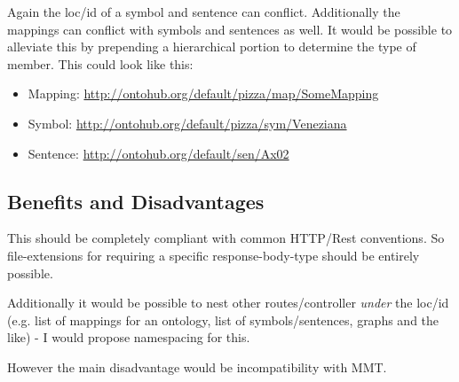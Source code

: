 \documentclass[a4paper,11pt,DIV=25]{scrartcl}
\begin{document}
Again the loc/id of a symbol and sentence can conflict. Additionally the
mappings can conflict with symbols and sentences as well. It would be possible
to alleviate this by prepending a hierarchical portion to determine the type of
member. This could look like this:

\begin{itemize}
  \item Mapping: \url{http://ontohub.org/default/pizza/map/SomeMapping}
  \item Symbol: \url{http://ontohub.org/default/pizza/sym/Veneziana}
  \item Sentence: \url{http://ontohub.org/default/sen/Ax02}
\end{itemize}

\subsection{Benefits and Disadvantages}

This should be completely compliant with common HTTP/Rest conventions.
So file-extensions for requiring a specific response-body-type should
be entirely possible.

Additionally it would be possible to nest other routes/controller
\textit{under} the loc/id (e.g. list of mappings for an ontology, list of
symbols/sentences, graphs and the like) - I would propose namespacing for this.

However the main disadvantage would be incompatibility with MMT.
\end{document}
